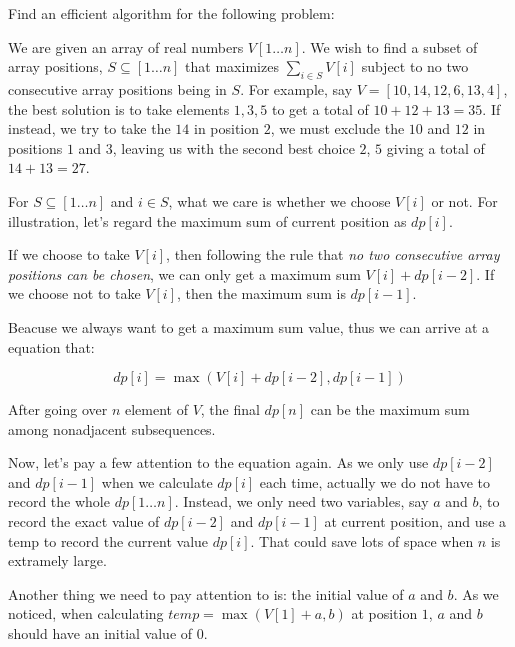 \newpage
{} %

\problemdes

Find an efficient algorithm for the following problem: 

We are given an array of real numbers $V[1 \ldots n]$. We wish to find a subset of array positions, $S \subseteq[1 \ldots n]$ that maximizes $\sum_{i \in S} V[i]$ subject to no two consecutive array positions being in $S$. For example, say $V=[10,14,12,6,13,4]$, the best solution is to take elements $1, 3, 5$ to get a total of $10 + 12 + 13 = 35$. If instead, we try to take the $14$ in position $2$, we must exclude the $10$ and $12$ in positions $1$ and $3$, leaving us with the second best choice $2$, $5$ giving a total of $14 + 13 = 27$.

\solution


For $S \subseteq[1 \ldots n]$ and $i \in S$, what we care is whether we choose $V[i]$ or not. For illustration, let's regard the maximum sum of current position as $dp[i]$.

If we choose to take $V[i]$, then following the rule that \textit{no two consecutive array positions can be chosen}, we can only get a maximum sum $V[i] + dp[i-2]$. If we choose not to take $V[i]$, then the maximum sum is $dp[i-1]$.

Beacuse we always want to get a maximum sum value, thus we can arrive at a equation that: 

\[dp[i] = \max (V[i] + dp[i-2], dp[i-1])\]

\noindent After going over $n$ element of $V$, the final $dp[n]$ can be the maximum sum among nonadjacent subsequences.

Now, let's pay a few attention to the equation again. As we only use $dp[i-2]$ and $dp[i-1]$ when we calculate $dp[i]$ each time, actually we do not have to record the whole $dp[1 \ldots n]$. Instead, we only need two variables, say $a$ and $b$, to record the exact value of $dp[i-2]$ and $dp[i-1]$ at current position, and use a temp to record the current value $dp[i]$. That could save lots of space when $n$ is extramely large. 

Another thing we need to pay attention to is: the initial value of $a$ and $b$. As we noticed, when calculating $temp = \max (V[1] + a, b)$ at position $1$, $a$ and $b$ should have an initial value of $0$.


